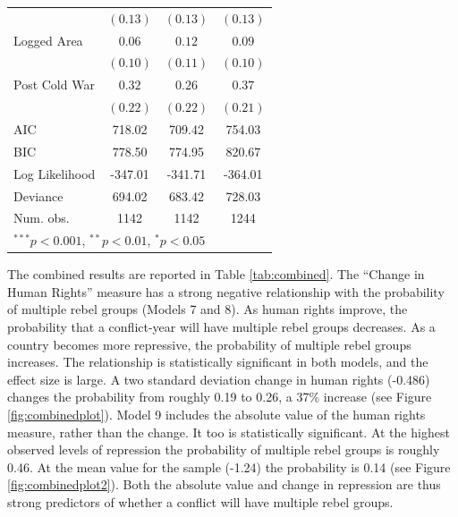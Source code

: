 \documentclass[12pt,]{book}
\let\origtable\table
\let\endorigtable\endtable
\renewenvironment{table}[1][2] {
    \singlespacing
    \expandafter\origtable\expandafter[H]
} {
    \endorigtable
}
\theoremstyle{definition}
\theoremstyle{definition}
\theoremstyle{definition}
\theoremstyle{remark}
\begin{document}
\begin{table}
\begin{center}
\begin{tabular}{l c c c }
                                        & $(0.13)$     & $(0.13)$      & $(0.13)$      \\
Logged Area                             & $0.06$       & $0.12$        & $0.09$        \\
                                        & $(0.10)$     & $(0.11)$      & $(0.10)$      \\
Post Cold War                           & $0.32$       & $0.26$        & $0.37$        \\
                                        & $(0.22)$     & $(0.22)$      & $(0.21)$      \\
\hline
AIC                                     & 718.02       & 709.42        & 754.03        \\
BIC                                     & 778.50       & 774.95        & 820.67        \\
Log Likelihood                          & -347.01      & -341.71       & -364.01       \\
Deviance                                & 694.02       & 683.42        & 728.03        \\
Num. obs.                               & 1142         & 1142          & 1244          \\
\hline
\multicolumn{4}{l}{\scriptsize{$^{***}p<0.001$, $^{**}p<0.01$, $^*p<0.05$}}
\end{tabular}
\caption{Logit Models of Multi-Rebel Conflict-Years}
\label{tab:combined}
\end{center}
\end{table}

The combined results are reported in Table \ref{tab:combined}. The
``Change in Human Rights'' measure has a strong negative relationship
with the probability of multiple rebel groups (Models 7 and 8). As human
rights improve, the probability that a conflict-year will have multiple
rebel groups decreases. As a country becomes more repressive, the
probability of multiple rebel groups increases. The relationship is
statistically significant in both models, and the effect size is large.
A two standard deviation change in human rights (-0.486) changes the
probability from roughly 0.19 to 0.26, a 37\% increase (see Figure
\ref{fig:combinedplot}). Model 9 includes the absolute value of the
human rights measure, rather than the change. It too is statistically
significant. At the highest observed levels of repression the
probability of multiple rebel groups is roughly 0.46. At the mean value
for the sample (-1.24) the probability is 0.14 (see Figure
\ref{fig:combinedplot2}). Both the absolute value and change in
repression are thus strong predictors of whether a conflict will have
multiple rebel groups.
\end{document}
